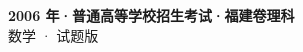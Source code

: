 \documentclass[zihao=-4, a4paper]{ctexart}
\begin{document}
\begin{center}
  {\Large\bfseries 2006 年·普通高等学校招生考试·福建卷理科}\\[4pt]
  {\large 数学 · 试题版}
\end{center}
\medskip
{}

\end{document}
